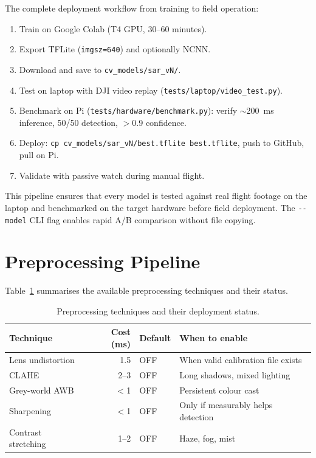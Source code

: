 The complete deployment workflow from training to field operation:

\begin{enumerate}
    \item Train on Google Colab (T4 GPU, 30--60 minutes).
    \item Export TFLite (\texttt{imgsz=640}) and optionally NCNN.
    \item Download and save to \texttt{cv\_models/sar\_vN/}.
    \item Test on laptop with DJI video replay
          (\texttt{tests/laptop/video\_test.py}).
    \item Benchmark on Pi (\texttt{tests/hardware/benchmark.py}): verify
          $\sim$200~ms inference, 50/50 detection, $>$0.9 confidence.
    \item Deploy: \texttt{cp cv\_models/sar\_vN/best.tflite best.tflite},
          push to GitHub, pull on Pi.
    \item Validate with passive watch during manual flight.
\end{enumerate}

This pipeline ensures that every model is tested against real flight footage on the
laptop and benchmarked on the target hardware before field deployment. The
\texttt{-{}-model} CLI flag enables rapid A/B comparison without file copying.


\section{Preprocessing Pipeline}
\label{sec:preprocessing}

Table~\ref{tab:preprocessing} summarises the available preprocessing techniques
and their status.

\begin{table}[htbp]
\centering
\caption{Preprocessing techniques and their deployment status.}
\label{tab:preprocessing}
\begin{tabular}{lrlp{4.5cm}}
\hline
\textbf{Technique} & \textbf{Cost (ms)} & \textbf{Default} & \textbf{When to enable} \\
\hline
Lens undistortion & 1.5 & OFF & When valid calibration file exists \\
CLAHE             & 2--3 & OFF & Long shadows, mixed lighting \\
Grey-world AWB    & $<$1 & OFF & Persistent colour cast \\
Sharpening        & $<$1 & OFF & Only if measurably helps detection \\
Contrast stretching & 1--2 & OFF & Haze, fog, mist \\
\hline
\end{tabular}
\end{table}

